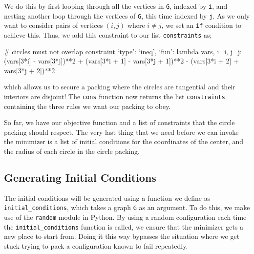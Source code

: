 \begin{flushleft}
We do this by first looping through all the vertices in \texttt{G}, indexed by \texttt{i}, and nesting another loop through the vertices of \texttt{G}, this time indexed by \texttt{j}. As we only want to consider pairs of vertices $(i,j)$ where $i \neq j$, we set an \texttt{if} condition to achieve this. Thus, we add this constraint to our list \texttt{constraints} as;
\end{flushleft}

\begin{code}
    # circles must not overlap constraint
    {`type': `ineq', `fun': lambda vars, i=i, j=j: 
    (vars[3*i] - vars[3*j])**2 + (vars[3*i + 1] - vars[3*j + 1])**2 - 
    (vars[3*i + 2] + vars[3*j + 2])**2}
\end{code}

\begin{flushleft}
which allows us to secure a packing where the circles are tangential and their interiors are disjoint! The \texttt{cons} function now returns the list \texttt{constraints} containing the three rules we want our packing to obey. 
\end{flushleft}

\begin{flushleft}
So far, we have our objective function and a list of constraints that the circle packing should respect. The very last thing that we need before we can invoke the minimizer is a list of initial conditions for the coordinates of the center, and the radius of each circle in the circle packing.
\end{flushleft}

\subsection{Generating Initial Conditions}

\begin{flushleft}
The initial conditions will be generated using a function we define as \texttt{initial\_conditions}, which takes a graph \texttt{G} as an argument. To do this, we make use of the \texttt{random} \cite{random} module in Python. By using a random configuration each time the \texttt{initial\_conditions} function is called, we ensure that the minimizer gets a new place to start from. Doing it this way bypasses the situation where we get stuck trying to pack a configuration known to fail repeatedly.
\end{flushleft}

